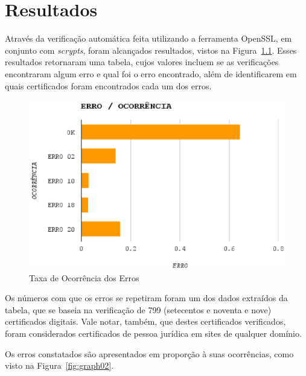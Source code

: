 

\chapter[Resultados]{Resultados}

	Através da verificação automática feita utilizando a ferramenta OpenSSL, em conjunto com \textit{scrypts}, foram alcançados resultados, vistos na Figura~\ref{fig:graph01}. Esses resultados retornaram uma tabela, cujos valores incluem se as verificações encontraram algum erro e qual foi o erro encontrado, além de identificarem em quais certificados foram encontrados cada um dos erros.

	\begin{figure}[h]
		\centering
		\includegraphics[keepaspectratio=true,scale=1]{figuras/graph01.eps}
		\caption{Taxa de Ocorrência dos Erros}
		\label{fig:graph01}
	\end{figure}

	Os números com que os erros se repetiram foram um dos dados extraídos da tabela, que se baseia na verificação de 799 (setecentos e noventa e nove) certificados digitais. Vale notar, também, que destes certificados verificados, foram considerados certificados de pessoa jurídica em sites de qualquer domínio.

	Os erros constatados são apresentados em proporção à suas ocorrências, como visto na Figura~\ref{fig:graph02}.

